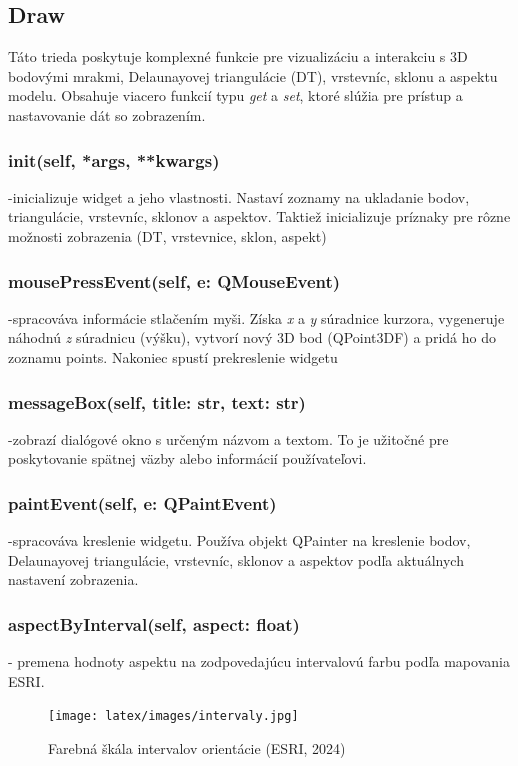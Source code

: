 \documentclass[12pt]{article}
\begin{document}
\subsection*{Draw}
Táto trieda poskytuje komplexné funkcie pre vizualizáciu a interakciu s 3D bodovými mrakmi,  Delaunayovej triangulácie (DT), vrstevníc, sklonu a aspektu modelu. Obsahuje viacero funkcií typu \textit{get} a \textit{set}, ktoré slúžia pre prístup a nastavovanie dát so zobrazením. 
\subsubsection*{\textunderscore\textunderscore init\textunderscore \textunderscore(self, *args, **kwargs)}
\noindent-inicializuje widget a jeho vlastnosti. Nastaví zoznamy na ukladanie bodov, triangulácie, vrstevníc, sklonov a aspektov. Taktiež inicializuje príznaky pre rôzne možnosti zobrazenia (DT, vrstevnice, sklon, aspekt) 
\subsubsection*{mousePressEvent(self, e: QMouseEvent)}
\noindent-spracováva informácie stlačením myši. Získa \textit{x} a \textit{y} súradnice kurzora, vygeneruje náhodnú \textit{z} súradnicu (výšku), vytvorí nový 3D bod (QPoint3DF) a pridá ho do zoznamu points. Nakoniec spustí prekreslenie widgetu
\subsubsection*{messageBox(self, title: str, text: str)}
\noindent-zobrazí dialógové okno s určeným názvom a textom. To je užitočné pre poskytovanie spätnej väzby alebo informácií používateľovi.
\subsubsection*{paintEvent(self, e: QPaintEvent)}
\noindents-spracováva kreslenie widgetu. Používa objekt QPainter na kreslenie bodov, Delaunayovej triangulácie, vrstevníc, sklonov a aspektov podľa aktuálnych nastavení zobrazenia.
\subsubsection*{aspectByInterval(self, aspect: float)} 
\noindent- premena hodnoty aspektu na zodpovedajúcu intervalovú farbu podľa mapovania ESRI.
\begin{figure}[h]
    \centering
    \texttt{[image: latex/images/intervaly.jpg]}
    \caption{Farebná škála intervalov orientácie (ESRI, 2024)}
    \label{fig:enter-label}
\end{figure}
\end{document}
